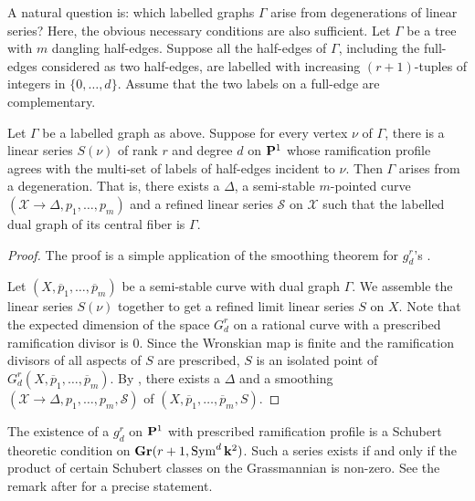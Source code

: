 \documentclass[11pt]{amsart}
\renewcommand {\P}{{\bf P}}
\providecommand {\Gr}{{\bf Gr}}
\providecommand{\Sym}{\operatorname{Sym}}
\begin{document}
A natural question is: which labelled graphs \(\Gamma\) arise from degenerations of linear series?
Here, the obvious necessary conditions are also sufficient.
Let \(\Gamma\) be a tree with \(m\) dangling half-edges.
Suppose all the half-edges of \(\Gamma\), including the full-edges considered as two half-edges, are labelled with increasing \((r+1)\)-tuples of integers in \(\{0,\dots,d\}\).
Assume that the two labels on a full-edge are complementary.
\begin{proposition}\label{prop:existence}
  Let \(\Gamma\) be a labelled graph as above.
  Suppose for every vertex \(\nu\) of \(\Gamma\), there is a linear series \(S(\nu)\) of rank \(r\) and degree \(d\) on \(\P^1\) whose ramification profile agrees with the multi-set of labels of half-edges incident to \(\nu\).
  Then \(\Gamma\) arises from a degeneration.
  That is, there exists a \(\Delta\), a semi-stable \(m\)-pointed curve \((\mathcal X \to \Delta, p_1, \dots, p_m)\) and a refined linear series \(\mathcal S\) on \(\mathcal X\) such that the labelled dual graph of its central fiber is \(\Gamma\).
\end{proposition}
\begin{proof}
  The proof is a simple application of the smoothing theorem for \(g^r_d\)'s \cite[Theorem~3.4]{eis.har:86}.
  
  Let \((X, \overline p_1, \dots, \overline p_m)\) be a semi-stable curve with dual graph \(\Gamma\).
  We assemble the linear series \(S(\nu)\) together to get a refined limit linear series \(S\) on \(X\).
  Note that the expected dimension of the space \(G^r_d\) on a rational curve with a prescribed ramification divisor is \(0\).
  Since the Wronskian map is finite and the ramification divisors of all aspects of \(S\) are prescribed, \(S\) is an isolated point of \(G^r_d(X, \overline p_1, \dots, \overline p_m)\).
  By \cite[Theorem~3.4]{eis.har:86}, there exists a \(\Delta\) and a smoothing \((\mathcal X \to \Delta, p_1, \dots, p_m, \mathcal S)\) of \((X, \overline p_1, \dots, \overline p_m, S)\).
\end{proof}

\begin{remark}\label{rem:existence}
  The existence of a \(g^r_d\) on \(\P^1\) with prescribed ramification profile is a Schubert theoretic condition on \(\Gr(r+1, \Sym^d\k^2)\).
  Such a series exists if and only if the product of certain Schubert classes on the Grassmannian is non-zero.
  See the remark after \cite[Theorem~2.3]{eis.har:83} for a precise statement.
\end{remark}
\end{document}
